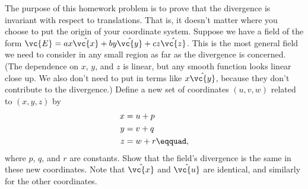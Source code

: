 The purpose of this homework problem is to prove that the
        divergence is invariant with respect to translations. That is, it
        doesn't matter where you choose to put the origin of your
        coordinate system. Suppose we have a field of the form
        $\vc{E}=ax\hat{\vc{x}}+by\hat{\vc{y}}+cz\hat{\vc{z}}$.
        This is the most general field we need to consider in
        any small region as far as the divergence is concerned. (The dependence
        on $x$, $y$, and $z$ is linear, but any smooth function looks
        linear close up. We also don't need to put in terms like
        $x\hat{\vc{y}}$, because they don't contribute to the divergence.)
        Define a new set of coordinates $(u,v,w)$ related to $(x,y,z)$  by
        \begin{align*}
                        x  &=  u + p  \\
                        y  &=  v + q     \\
                        z  &=  w + r\eqquad,  
        \end{align*}
        where $p$, $q$, and $r$ are constants. Show that the field's
        divergence is the same in these new coordinates. Note that $\hat{\vc{x}}$
        and $\hat{\vc{u}}$ are identical, and similarly for the other coordinates.
